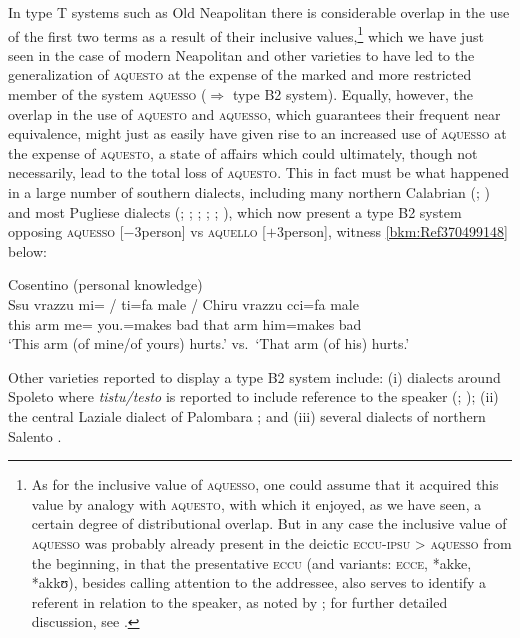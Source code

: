 \documentclass[output=paper]{langsci/langscibook}
\begin{document}
In type T systems such as Old Neapolitan there is considerable overlap
in the use of the first two terms as a result of their inclusive
values,\footnote{As for the inclusive value of \textsc{aquesso}, one could
assume that it acquired this value by analogy with \textsc{aquesto}, with which
it enjoyed, as we have seen, a certain degree of distributional overlap. But in
any case the inclusive value of \textsc{aquesso} was probably already present
in the deictic \textsc{eccu-ipsu} > \textsc{aquesso} from the beginning, in
that the presentative \textsc{eccu} (and variants: \textsc{ecce}, *akke,
*akkʊ), besides calling attention to the addressee, also serves to identify a
referent in relation to the speaker, as noted by \citet[279]{Anderson:1985a};
for further detailed discussion, see \citet[78--87]{ledgeway2004sviluppo}.}
which we have just seen in the case of modern Neapolitan and other varieties to
have led to the generalization of \textsc{aquesto} at the expense of the marked
and more restricted member of the system \textsc{aquesso} (${\Rightarrow}$ type
B2 system). Equally, however, the overlap in the use of \textsc{aquesto}
and \textsc{aquesso}, which guarantees their frequent near equivalence, might
just as easily have given rise to an increased use of \textsc{aquesso} at the
expense of \textsc{aquesto}, a state of affairs which could ultimately, though
not necessarily, lead to the total loss of \textsc{aquesto}. This in fact must
be what happened in a large number of southern dialects, including many
northern Calabrian (\citealt[167]{Rohlfs:1977a};
\citealt[104--107]{ledgeway2004sviluppo}) and most Pugliese dialects
(\citealt[207]{Rohlfs:1968a}; \citealt[27]{Valente:1975a};
\citealt[248]{Loporcaro:1988a}; \citealt[344]{Loporcaro:1997a};
\citealt[129f]{Loporcaro:2009a}; \citealt[107f]{ledgeway2004sviluppo}), which
now present a type B2 system opposing \textsc{aquesso}
[$-$3person] vs \textsc{aquello} [$+$3person], witness \eqref{bkm:Ref370499148} below:

\ea\label{bkm:Ref370499148} Cosentino (personal knowledge)\\
    \gll Ssu  vrazzu  mi= / ti=fa  male \textup{\quad /\quad}  Chiru  vrazzu cci=fa  male\\
        this  arm  me= {} you.\Sg{}=makes  bad {} that  arm  him=makes bad\\
    \glt \enquote*{This arm (of mine/of yours) hurts.} vs.\ \enquote*{That arm
        (of his) hurts.}
\z

Other  varieties reported to display a type B2 system
include: (i) dialects around Spoleto where \emph{tistu/testo} is reported to
include reference to the speaker (\citealt[98]{Moretti:1987a};
\citealt[171]{Stavinschi:2009a}); (ii) the central Laziale dialect of Palombara
\citep[140]{Stavinschi:2009a}; and (iii) several dialects of northern Salento
\citep[157, 159]{Mancarella:1998a}.
\end{document}
